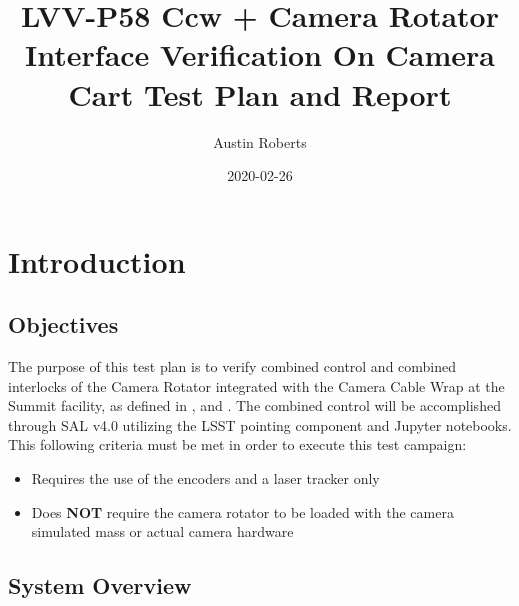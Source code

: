 \documentclass[SE,STR,toc]{lsstdoc}
\providecommand{\tightlist}{
  \setlength{\itemsep}{0pt}\setlength{\parskip}{0pt}}
\begin{document}
\def\milestoneName{Ccw + Camera Rotator Interface Verification On Camera Cart}
\def\milestoneId{LVV-P58}
\def\product{SIT-COM Integration}


\title{ LVV-P58 Ccw + Camera Rotator Interface Verification On Camera Cart Test Plan and Report}
\setDocRef{\lsstDocType-\lsstDocNum}
\date{2020-02-26}
\author{ Austin Roberts }






\maketitle

\section{Introduction}
\label{sect:intro}


\subsection{Objectives}
\label{sect:objectives}

 The purpose of this test plan is to verify combined control and combined
interlocks of the Camera Rotator integrated with the Camera Cable Wrap
at the Summit facility, as defined in ,  and . The
combined control will be accomplished through SAL v4.0 utilizing the
LSST pointing component and Jupyter notebooks. This following criteria
must be met in order to execute this test campaign:

\begin{itemize}
\tightlist
\item
  Requires the use of the encoders and a laser tracker only
\item
  Does \textbf{NOT} require the camera rotator to be loaded with the
  camera simulated mass or actual camera hardware
\end{itemize}



\subsection{System Overview}
\label{sect:systemoverview}
\end{document}
